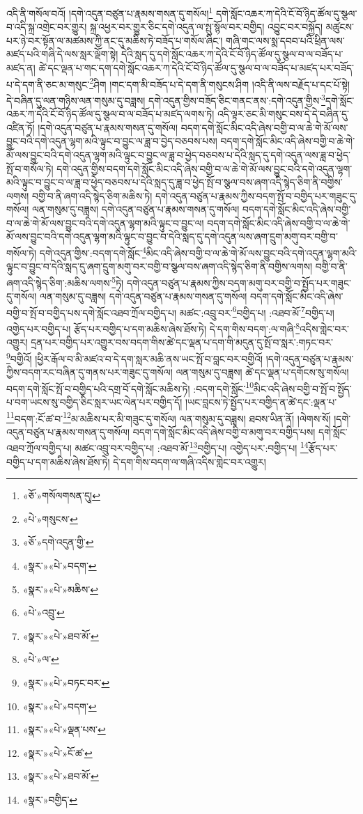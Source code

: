 འདི་ནི་གསོལ་བའོ། །དགེ་འདུན་བཙུན་པ་རྣམས་གསན་དུ་གསོལ།\footnote{«ཅོ་»གསོལགསན་དུ།} དགེ་སློང་འཆར་ཀ་དེའི་ངོ་བོ་ཉིད་ཚོལ་དུ་སྩལ་བ་འདི་སྐྲ་འགྲེང་བར་གྱུར། སྐྲ་འཕྱར་བར་གྱུར་ཅིང་དགེ་འདུན་ལ་སྤུ་སྙོལ་བར་བགྱིད། འབྱུང་བར་བསྐྱོད། མཚུངས་པར་ཉེ་བར་སྟོན་ལ་མཚམས་ཀྱི་ནང་དུ་མཆིས་ཏེ་བཟོད་པ་གསོལ་ཞིང་། གཞི་གང་ལས་སྨ་དབབ་པའི་ཕྲིན་ལས་མཛད་པའི་གཞི་དེ་ལས་སླར་ལྡོག་སྟེ། དེའི་སླད་དུ་དགེ་སློང་འཆར་ཀ་དེའི་ངོ་བོ་ཉིད་ཚོལ་དུ་སྩལ་བ་ལ་བཟོད་པ་མཛད་ན། ཚེ་དང་ལྡན་པ་གང་དག་དགེ་སློང་འཆར་ཀ་དེའི་ངོ་བོ་ཉིད་ཚོལ་དུ་སྩལ་བ་ལ་བཟོད་པ་མཛད་པར་བཟོད་པ་དེ་དག་ནི་ཅང་མ་གསུང་\footnote{«པེ་»གསུངས་}ཤིག །གང་དག་མི་བཟོད་པ་དེ་དག་ནི་གསུངས་ཤིག །འདི་ནི་ལས་བརྗོད་པ་དང་པོ་སྟེ། དེ་བཞིན་དུ་ལན་གཉིས་ལན་གསུམ་དུ་བཟླས། དགེ་འདུན་གྱིས་བཟོད་ཅིང་གནང་ནས་:དགེ་འདུན་གྱིས་\footnote{«ཅོ་»དགེ་འདུན་གྱི་}དགེ་སློང་འཆར་ཀ་དེའི་ངོ་བོ་ཉིད་ཚོལ་དུ་སྩལ་བ་ལ་བཟོད་པ་མཛད་ལགས་ཏེ། འདི་ལྟར་ཅང་མི་གསུང་བས་དེ་དེ་བཞིན་དུ་འཛིན་ཏོ། །དགེ་འདུན་བཙུན་པ་རྣམས་གསན་དུ་གསོལ། བདག་དགེ་སློང་མིང་འདི་ཞེས་བགྱི་བ་ལ་ཆེ་གེ་མོ་ལས་བྱུང་བའི་དགེ་འདུན་ལྷག་མའི་ལྟུང་བ་བྱུང་ལ་ཟླ་བ་བྱེད་བཅབས་པས། བདག་དགེ་སློང་མིང་འདི་ཞེས་བགྱི་བ་ཆེ་གེ་མོ་ལས་བྱུང་བའི་དགེ་འདུན་ལྷག་མའི་ལྟུང་བ་བྱུང་ལ་ཟླ་བ་ཕྱེད་བཅབས་པ་དེའི་སླད་དུ་དགེ་འདུན་ལས་ཟླ་བ་ཕྱེད་སྤོ་བ་གསོལ་ཏེ། དགེ་འདུན་གྱིས་བདག་དགེ་སློང་མིང་འདི་ཞེས་བགྱི་བ་ལ་ཆེ་གེ་མོ་ལས་བྱུང་བའི་དགེ་འདུན་ལྷག་མའི་ལྟུང་བ་བྱུང་བ་ལ་ཟླ་བ་ཕྱེད་བཅབས་པ་དེའི་སླད་དུ་ཟླ་བ་ཕྱེད་སྤོ་བ་སྩལ་བས་ཞག་འདི་སྙེད་ཅིག་ནི་བགྱིས་ལགས། བགྱི་བ་ནི་ཞག་འདི་སྙེད་ཅིག་མཆིས་ཏེ། དགེ་འདུན་བཙུན་པ་རྣམས་ཀྱིས་བདག་སྤོ་བ་བགྱིད་པར་གཟུང་དུ་གསོལ། ལན་གསུམ་དུ་བཟླས། དགེ་འདུན་བཙུན་པ་རྣམས་གསན་དུ་གསོལ། བདག་དགེ་སློང་མིང་འདི་ཞེས་བགྱི་བ་ལ་ཆེ་གེ་མོ་ལས་བྱུང་བའི་དགེ་འདུན་ལྷག་མའི་ལྟུང་བ་བྱུང་ལ། བདག་དགེ་སློང་མིང་འདི་ཞེས་བགྱི་བ་ལ་ཆེ་གེ་མོ་ལས་བྱུང་བའི་དགེ་འདུན་ལྷག་མའི་ལྟུང་བ་བྱུང་བ་དེའི་སླད་དུ་དགེ་འདུན་ལས་ཞག་དྲུག་མགུ་བར་བགྱི་བ་གསོལ་ཏེ། དགེ་འདུན་གྱིས་:བདག་དགེ་སློང་\footnote{«སྣར་»«པེ་»བདག་}མིང་འདི་ཞེས་བགྱི་བ་ལ་ཆེ་གེ་མོ་ལས་བྱུང་བའི་དགེ་འདུན་ལྷག་མའི་ལྟུང་བ་བྱུང་བ་དེའི་སླད་དུ་ཞག་དྲུག་མགུ་བར་བགྱི་བ་སྩལ་བས་ཞག་འདི་སྙེད་ཅིག་ནི་བགྱིས་ལགས། བགྱི་བ་ནི་ཞག་འདི་སྙེད་ཅིག་:མཆིས་ལགས་\footnote{«སྣར་»«པེ་»མཆིས་}ཏེ། དགེ་འདུན་བཙུན་པ་རྣམས་ཀྱིས་བདག་མགུ་བར་བགྱི་བ་སྤྱོད་པར་གཟུང་དུ་གསོལ། ལན་གསུམ་དུ་བཟླས། དགེ་འདུན་བཙུན་པ་རྣམས་གསན་དུ་གསོལ། བདག་དགེ་སློང་མིང་འདི་ཞེས་བགྱི་བ་སྤོ་བ་བགྱིད་པས་དགེ་སློང་འཐབ་ཀྲོལ་བགྱིད་པ། མཚང་:འབྲུ་བར་\footnote{«པེ་»འབྲུ་}བགྱིད་པ། :འཐབ་མོ་\footnote{«སྣར་»«པེ་»ཐབ་མོ་}བགྱིད་པ། འགྱེད་པར་བགྱིད་པ། རྩོད་པར་བགྱིད་པ་དག་མཆིས་ཞེས་ཐོས་ཏེ། དེ་དག་གིས་བདག་:ལ་གཞི་\footnote{«པེ་»ལ་}འདིས་གླེང་བར་འགྱུར། དྲན་པར་བགྱིད་པར་འགྱུར་བས་བདག་གིས་ཚེ་དང་ལྡན་པ་དག་གི་མདུན་དུ་སྤོ་བ་སླར་:གཏང་བར་\footnote{«སྣར་»«པེ་»བཏང་བར་}བགྱིའོ། །ཕྱིར་རྒོལ་བ་མི་མཛའ་བ་དེ་དག་སླར་མཆི་ནས་ཡང་སྤོ་བ་བླང་བར་བགྱིའོ། །དགེ་འདུན་བཙུན་པ་རྣམས་ཀྱིས་བདག་རང་བཞིན་དུ་གནས་པར་གཟུང་དུ་གསོལ། ལན་གསུམ་དུ་བཟླས། ཚེ་དང་ལྡན་པ་དགོངས་སུ་གསོལ། བདག་དགེ་སློང་སྤོ་བ་བགྱིད་པའི་དགྲ་བོ་དགེ་སློང་མཆིས་ཏེ། :བདག་དགེ་སློང་\footnote{«སྣར་»«པེ་»བདག་}མིང་འདི་ཞེས་བགྱི་བ་སྤོ་བ་སྤྱོད་པ་བག་ཡངས་སུ་བགྱིད་ཅིང་སླར་ཡང་ལེན་པར་བགྱིད་དོ། །ཡང་བླངས་ཏེ་སྤྱོད་པར་བགྱིད་ན་ཚེ་དང་:ལྡན་པ་\footnote{«སྣར་»«པེ་»ལྡན་པས་}བདག་:ངོ་ཚ་བ་\footnote{«སྣར་»«པེ་»ངོ་ཚ་}མ་མཆིས་པར་མི་གཟུང་དུ་གསོལ། ལན་གསུམ་དུ་བཟླས། ཐབས་ཡིན་ནོ། །ལེགས་སོ། །དགེ་འདུན་བཙུན་པ་རྣམས་གསན་དུ་གསོལ། བདག་དགེ་སློང་མིང་འདི་ཞེས་བགྱི་བ་མགུ་བར་བགྱིད་པས། དགེ་སློང་འཐབ་ཀྲོལ་བགྱིད་པ། མཚང་འབྲུ་བར་བགྱིད་པ། :འཐབ་མོ་\footnote{«སྣར་»«པེ་»ཐབ་མོ་}བགྱིད་པ། འགྱེད་པར་:བགྱིད་པ། \footnote{«སྣར་»བགྱིད་}རྩོད་པར་བགྱིད་པ་དག་མཆིས་ཞེས་ཐོས་ཏེ། དེ་དག་གིས་བདག་ལ་གཞི་འདིས་གླེང་བར་འགྱུར། 